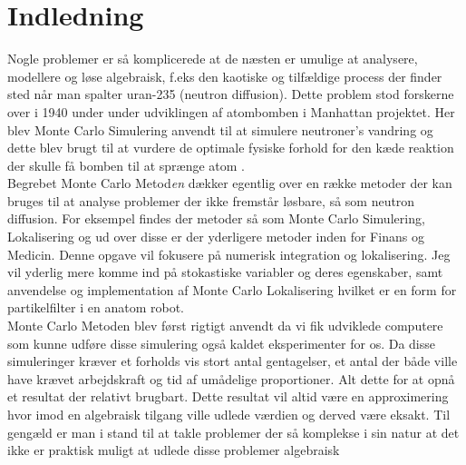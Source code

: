 \documentclass[../../SRP.tex]{subfiles}
\begin{document}
\chapter{Indledning}


Nogle problemer er så komplicerede at de næsten er umulige at analysere, modellere og løse algebraisk, f.eks den kaotiske og tilfældige process der finder sted når man spalter uran-235 (neutron diffusion). Dette problem stod forskerne over i 1940 under under udviklingen af atombomben i Manhattan projektet. Her blev Monte Carlo Simulering anvendt til at simulere neutroner's vandring og dette blev brugt til at vurdere de optimale fysiske forhold for den kæde reaktion der skulle få bomben til at sprænge atom \cite{AHF}. \\

Begrebet Monte Carlo Metod\textit{en} dækker egentlig over en række metoder der kan bruges til at analyse problemer der ikke fremstår løsbare, så som neutron diffusion. For eksempel findes der metoder så som Monte Carlo Simulering, Lokalisering og ud over disse er der yderligere metoder inden for Finans og Medicin. Denne opgave vil fokusere på numerisk integration og lokalisering. Jeg vil yderlig mere komme ind på stokastiske variabler og deres egenskaber, samt anvendelse og implementation af Monte Carlo Lokalisering hvilket er en form for partikelfilter i en anatom robot. \\

Monte Carlo Metoden blev først rigtigt anvendt da vi fik udviklede computere som kunne udføre disse simulering også kaldet eksperimenter for os. Da disse simuleringer kræver et forholds vis stort antal gentagelser, et antal der både ville have krævet arbejdskraft og tid af umådelige proportioner. Alt dette for at opnå et resultat der relativt brugbart. Dette resultat vil altid være en approximering hvor imod en algebraisk tilgang ville udlede værdien og derved være eksakt. Til gengæld er man i stand til at takle problemer der så komplekse i sin natur at det ikke er praktisk muligt at udlede disse problemer algebraisk \cite{SBM} \\
\end{document}
